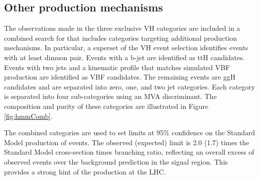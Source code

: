 \subsection{Other production mechanisms}

The observations made in the three exclusive VH categories are included in a combined search for \hmm that includes categories targeting additional production mechanisms.
In particular, a superset of the VH event selection identifies events with at least dimuon pair.
Events with a b-jet are identified as ttH candidates.
Events with two jets and a kinematic profile that matches simulated VBF production are identified as VBF candidates.
The remaining events are ggH candidates and are separated into zero, one, and two jet categories.
Each category is separated into four sub-categories using an MVA discriminant.
The composition and purity of these categories are illustrated in Figure \ref{fig:hmmComb}.
\cite{atlasHmm}

The combined categories are used to set limits at 95\% confidence on the Standard Model production of \hmm events.
The observed (expected) limit is 2.0 (1.7) times the Standard Model cross-section times branching ratio, reflecting an overall excess of observed events over the background prediction in the signal region.
This provides a strong hint of the \hmm production at the LHC.

